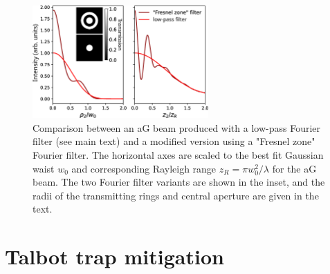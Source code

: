 \begin{figure}[!ht]
    \centering
    \includegraphics[width=0.6\textwidth]{Images/figure6.eps}
    \caption{Comparison between an aG beam produced with a low-pass Fourier filter (see main text) and a modified version using a "Fresnel zone" Fourier filter. The horizontal axes are scaled to the best fit Gaussian waist $w_0$ and corresponding Rayleigh range $z_R=\pi w_0^2/\lambda$ for the aG beam. The two Fourier filter variants are shown in the inset, and the radii of the transmitting rings and central aperture are given in the text.}
    \label{fig:zonefilter}
\end{figure}

\section{Talbot trap mitigation}\label{sec:talbot}

